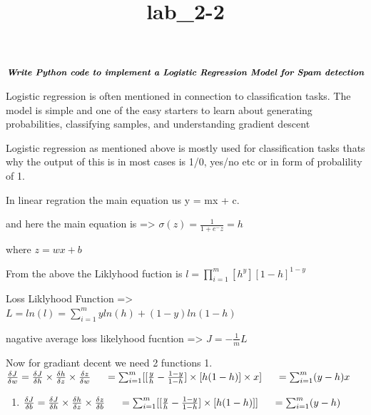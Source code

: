 \documentclass[11pt]{article}
\title{lab\_2-2}
\providecommand{\tightlist}{%
      \setlength{\itemsep}{0pt}\setlength{\parskip}{0pt}}
\begin{document}
    
    \maketitle
    
    

    
    \(\textit{\textbf{Write Python code to implement a Logistic Regression Model for Spam detection}}\)

    Logistic regression is often mentioned in connection to classification
tasks. The model is simple and one of the easy starters to learn about
generating probabilities, classifying samples, and understanding
gradient descent

    Logistic regression as mentioned above is mostly used for classification
tasks thats why the output of this is in most cases is 1/0, yes/no etc
or in form of probalility of 1.

    In linear regration the main equation us y = mx + c.~

and here the main equation is =\textgreater{}
\(\sigma(z) = \frac{1}{1+e^-z} = h\)

    where \(z = wx + b\)

    From the above the Liklyhood fuction is
\(l = \prod_{i = 1}^{m}[h^y][1-h]^{1-y}\)

    Loss Liklyhood Function =\textgreater{}
\(L = ln(l) = \sum_{i=1}^{m} yln(h) + (1-y)ln(1-h)\)

    nagative average loss likelyhood fucntion =\textgreater{}
\(J = -\frac{1}{m} L\)

    Now for gradiant decent we need 2 functions 1.
\(\frac{\delta J}{\delta w} = \frac{\delta J}{\delta h} \times \frac{\delta h}{\delta z} \times \frac{\delta z}{\delta w} \\\\ \hspace{0.5cm}= \sum_{i=1}^{m} [[\frac{y}{h} - \frac{1-y}{1-h}] \times [h (1-h)] \times x] \\\\ \hspace{0.5cm}= \sum_{i=1}^{m}(y-h)x\)

\begin{enumerate}
\def\labelenumi{\arabic{enumi}.}
\setcounter{enumi}{1}
\tightlist
\item
  \(\frac{\delta J}{\delta b} = \frac{\delta J}{\delta h} \times \frac{\delta h}{\delta z} \times \frac{\delta z}{\delta b} \\\\ \hspace{0.5cm}= \sum_{i=1}^{m} [[\frac{y}{h} - \frac{1-y}{1-h}] \times [h (1-h)]] \\\\ \hspace{0.5cm}= \sum_{i=1}^{m}(y-h)\)
\end{enumerate}
\end{document}
